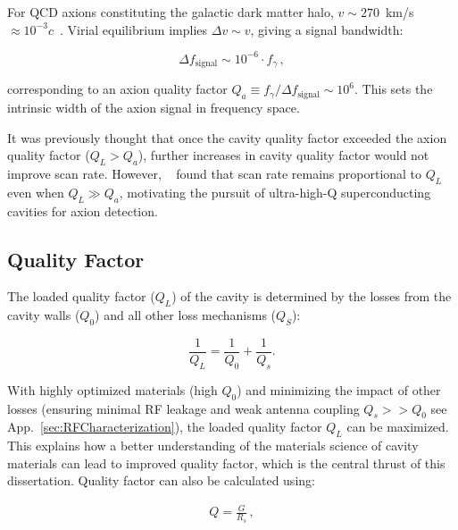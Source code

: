     \noindent For QCD axions constituting the galactic dark matter halo, $v \sim 270$~km/s $\approx 10^{-3}c$~\cite{lewinReviewMathematicsNumerical1996, evansRefinementStandardHalo2019}. Virial equilibrium implies $\Delta v \sim v$, giving a signal bandwidth:
    
    \begin{equation}
        \Delta f_{\text{signal}} \sim 10^{-6} \cdot f_{\gamma} \,,
    \end{equation}
    
    \noindent corresponding to an axion quality factor $Q_a \equiv f_{\gamma}/\Delta f_{\text{signal}} \sim 10^6$. This sets the intrinsic width of the axion signal in frequency space. 

    It was previously thought that once the cavity quality factor exceeded the axion quality factor ($Q_L > Q_a$), further increases in cavity quality factor would not improve scan rate. However, \citeauthor{Cervantes:2022gtv}~\cite{Cervantes:2022gtv} found that scan rate remains proportional to $Q_L$ even when $Q_L \gg Q_a$, motivating the pursuit of ultra-high-Q superconducting cavities for axion detection.
    
    \subsection{Quality Factor}\label{sec:QualityCh2}

    The loaded quality factor ($Q_L$) of the cavity is determined by the losses from the cavity walls ($Q_0$) and all other loss mechanisms ($Q_S$):

    \begin{equation}
        \frac{1}{Q_L}= \frac{1}{Q_0} + \frac{1}{Q_s} .  \label{eq:QualityHW} 
    \end{equation}

    \noindent With highly optimized materials (high $Q_0$) and minimizing the impact of other losses (ensuring minimal RF leakage and weak antenna coupling $Q_s>>Q_0$ see App.~\ref{sec:RFCharacterization}), the loaded quality factor $Q_L$ can be maximized. This explains how a better understanding of the materials science of cavity materials can lead to improved quality factor, which is the central thrust of this dissertation. Quality factor can also be calculated using:
        
    \begin{align}
        Q = \frac{G}{R_s} \label{eq:Q0_geometric} \,,
    \end{align}
    
